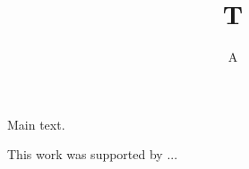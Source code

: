 \documentclass{quantumarticle}
\begin{document}
\title{T}
\author{A}
\maketitle
Main text.

\acknowledgments
This work was supported by ...
\end{document}
